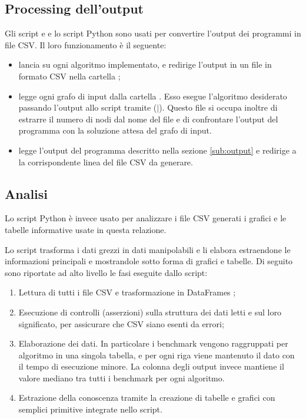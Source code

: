 \subsection{Processing dell'output}

Gli script  e  e lo script Python  sono usati per convertire l'output dei programmi in file CSV. Il loro funzionamento è il seguente:

\begin{itemize}
    \item {} lancia  su ogni algoritmo implementato, e redirige l'output in un file in formato CSV nella cartella ;
    \item {} legge ogni grafo di input dalla cartella . Esso esegue l'algoritmo desiderato passando l'output allo script  tramite  ($\vert$). Questo file si occupa inoltre di estrarre il numero di nodi dal nome del file e di confrontare l'output del programma con la soluzione attesa del grafo di input.
    \item {} legge l'output del programma descritto nella sezione \ref{sub:output} e redirige a  la corrispondente linea del file CSV da generare.
\end{itemize}
 
\subsection{Analisi}
 
\noindent Lo script Python  è invece usato per analizzare i file CSV generati i grafici e le tabelle informative usate in questa relazione.

\noindent Lo script trasforma i dati grezzi in dati manipolabili e li
elabora estraendone le informazioni principali e mostrandole sotto
forma di grafici e tabelle. Di seguito sono riportate ad alto
livello le fasi eseguite dallo script:

\begin{enumerate}
    \item Lettura di tutti i file CSV e trasformazione in DataFrames ;
    \item Esecuzione di controlli (asserzioni) sulla struttura dei dati
      letti e sul loro significato, per assicurare che CSV siano esenti da errori;
    \item Elaborazione dei dati. In particolare i benchmark vengono raggruppati
      per algoritmo in una singola tabella, e per ogni riga
      viene mantenuto il dato con il tempo di esecuzione minore. La
      colonna degli output invece mantiene il valore mediano tra tutti
      i benchmark per ogni algoritmo.
    \item Estrazione della conoscenza tramite la creazione di tabelle
      e grafici con semplici primitive integrate nello script.
    \label{script-phase-analysis}
\end{enumerate}


